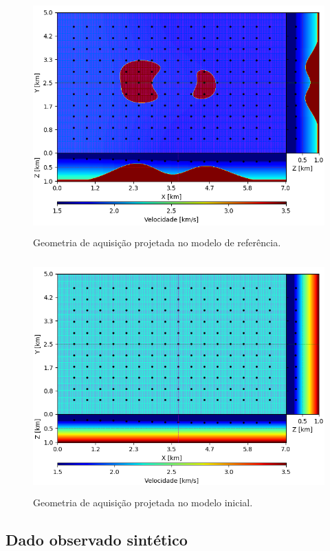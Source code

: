 \begin{figure}[H]
	\centering
	\includegraphics[width=12cm,height=9cm]{Imgs/Metodologia/true_model_geometry.png}
	\caption{Geometria de aquisição projetada no modelo de referência.}
	\label{fig:true_model_geometry}	
\end{figure}
\begin{figure}[H]
	\centering
	\includegraphics[width=12cm,height=9cm]{Imgs/Metodologia/init_model_geometry.png}
	\caption{Geometria de aquisição projetada no modelo inicial.}
	\label{fig:init_model_geometry}	
\end{figure}

\subsection{Dado observado sintético}

